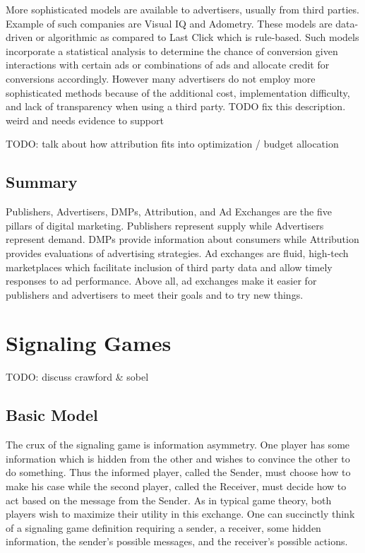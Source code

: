\documentclass{article}
\begin{document}
More sophisticated models are available to advertisers, usually from third parties. Example of such companies are Visual IQ and Adometry. These models are data-driven or algorithmic as compared to Last Click which is rule-based. Such models incorporate a statistical analysis to determine the chance of conversion given interactions with certain ads or combinations of ads and allocate credit for conversions accordingly. However many advertisers do not employ more sophisticated methods because of the additional cost, implementation difficulty, and lack of transparency when using a third party. TODO fix this description. weird and needs evidence to support

TODO: talk about how attribution fits into optimization / budget allocation

\subsection{Summary}

Publishers, Advertisers, DMPs, Attribution, and Ad Exchanges are the five pillars of digital marketing. Publishers represent supply while Advertisers represent demand. DMPs provide information about consumers while Attribution provides evaluations of advertising strategies. Ad exchanges are fluid, high-tech marketplaces which facilitate inclusion of third party data and allow timely responses to ad performance. Above all, ad exchanges make it easier for publishers and advertisers to meet their goals and to try new things. 

\newpage

\section{Signaling Games}

TODO: discuss crawford \& sobel

\subsection{Basic Model}

The crux of the signaling game is information asymmetry. One player has some information which is hidden from the other and wishes to convince the other to do something. Thus the informed player, called the Sender, must choose how to make his case while the second player, called the Receiver, must decide how to act based on the message from the Sender. As in typical game theory, both players wish to maximize their utility in this exchange. One can succinctly think of a signaling game definition requiring a sender, a receiver, some hidden information, the sender's possible messages, and the receiver's possible actions.
\end{document}
